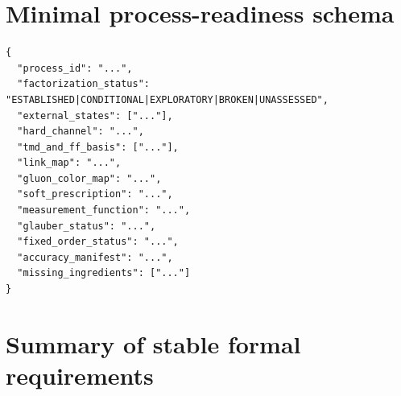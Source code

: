 \documentclass[11pt]{article}
\begin{document}
\section{Minimal process-readiness schema}
\label{app:process-schema}

\begin{verbatim}
{
  "process_id": "...",
  "factorization_status": "ESTABLISHED|CONDITIONAL|EXPLORATORY|BROKEN|UNASSESSED",
  "external_states": ["..."],
  "hard_channel": "...",
  "tmd_and_ff_basis": ["..."],
  "link_map": "...",
  "gluon_color_map": "...",
  "soft_prescription": "...",
  "measurement_function": "...",
  "glauber_status": "...",
  "fixed_order_status": "...",
  "accuracy_manifest": "...",
  "missing_ingredients": ["..."]
}
\end{verbatim}

\section{Summary of stable formal requirements}
\label{app:requirements}
\end{document}
